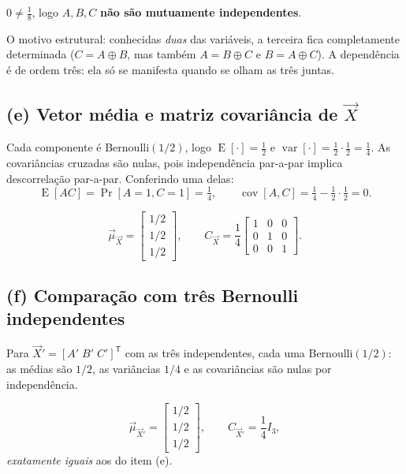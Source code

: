 \documentclass[11pt,a4paper]{article}
\renewcommand{\Pr}{\operatorname{Pr}}
\DeclareMathOperator{\E}{E}
\DeclareMathOperator{\var}{var}
\DeclareMathOperator{\cov}{cov}
\begin{document}
\begin{resp}
$0\ne\tfrac18$, logo $A,B,C$ \textbf{não são mutuamente independentes}.
\end{resp}

O motivo estrutural: conhecidas \emph{duas} das variáveis, a terceira fica
completamente determinada ($C=A\oplus B$, mas também $A=B\oplus C$ e
$B=A\oplus C$). A dependência é de ordem três: ela só se manifesta quando se
olham as três juntas.

\subsection*{(e) Vetor média e matriz covariância de $\vec X$}

Cada componente é Bernoulli$(1/2)$, logo $\E[\cdot]=\tfrac12$ e
$\var[\cdot]=\tfrac12\cdot\tfrac12=\tfrac14$. As covariâncias cruzadas são nulas,
pois independência par-a-par implica descorrelação par-a-par. Conferindo uma delas:
\[
\E[AC]=\Pr[A=1,C=1]=\tfrac14,
\qquad
\cov[A,C]=\tfrac14-\tfrac12\cdot\tfrac12=0 .
\]

\begin{resp}
\[
\vec\mu_{\vec X}=\begin{bmatrix}1/2\\1/2\\1/2\end{bmatrix},
\qquad
C_{\vec X}=\frac14\begin{bmatrix}1&0&0\\0&1&0\\0&0&1\end{bmatrix}.
\]
\end{resp}

\subsection*{(f) Comparação com três Bernoulli independentes}

Para $\vec X'=[A'\;B'\;C']^{\mathsf T}$ com as três independentes, cada uma
Bernoulli$(1/2)$: as médias são $1/2$, as variâncias $1/4$ e as covariâncias são
nulas por independência.

\begin{resp}
\[
\vec\mu_{\vec X'}=\begin{bmatrix}1/2\\1/2\\1/2\end{bmatrix},
\qquad
C_{\vec X'}=\frac14 I_3 ,
\]
\emph{exatamente iguais} aos do item (e).
\end{resp}
\end{document}
